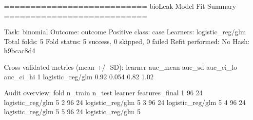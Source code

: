 \begin{CodeOutput}
===========================
 bioLeak Model Fit Summary
===========================

Task: binomial
Outcome: outcome
Positive class: case
Learners: logistic_reg/glm
Total folds: 5
Fold status: 5 success, 0 skipped, 0 failed
Refit performed: No
Hash: h9bcac8d4

Cross-validated metrics (mean +/- SD):
           learner auc_mean auc_sd auc_ci_lo auc_ci_hi
1 logistic_reg/glm     0.92  0.054      0.82      1.02

Audit overview:
 fold n_train n_test          learner features_final
    1      96     24 logistic_reg/glm              5
    2      96     24 logistic_reg/glm              5
    3      96     24 logistic_reg/glm              5
    4      96     24 logistic_reg/glm              5
    5      96     24 logistic_reg/glm              5
\end{CodeOutput}
